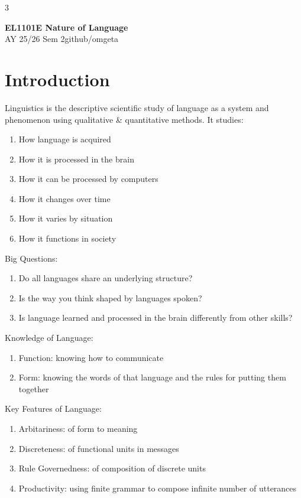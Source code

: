 \documentclass[12pt, a4paper]{article}
\newcommand{\mytitle}{EL1101E Nature of Language}
\newcommand{\myauthor}{github/omgeta}
\newcommand{\mydate}{AY 25/26 Sem 2}
\begin{document}
\raggedright
\footnotesize
\begin{multicols*}{3}
\setlength{\premulticols}{1pt}
\setlength{\postmulticols}{1pt}
\setlength{\multicolsep}{1pt}
\setlength{\columnsep}{2pt}

{\normalsize{\textbf{\mytitle}}}\\
{\footnotesize{\mydate\hspace{2pt}\textemdash\hspace{2pt}\myauthor}}
\section{Introduction}
Linguistics is the descriptive scientific study of language as a system and phenomenon using qualitative \& quantitative methods. It studies:
\begin{enumerate}[\roman*.]
  \item How language is acquired
  \item How it is processed in the brain
  \item How it can be processed by computers
  \item How it changes over time
  \item How it varies by situation
  \item How it functions in society
\end{enumerate}

Big Questions:
\begin{enumerate}[\roman*.]
  \item Do all languages share an underlying structure?
  \item Is the way you think shaped by languages spoken?
  \item Is language learned and processed in the brain differently from other skills?
\end{enumerate}

Knowledge of Language:
\begin{enumerate}[\roman*.]
  \item Function: knowing how to communicate
  \item Form: knowing the words of that language and the rules for putting them together
\end{enumerate}

Key Features of Language:
\begin{enumerate}[\roman*.]
  \item Arbitariness: of form to meaning 
  \item Discreteness: of functional units in messages
  \item Rule Governedness: of composition of discrete units 
  \item Productivity: using finite grammar to compose infinite number of utterances
\end{enumerate}


\end{multicols*}
\end{document}
